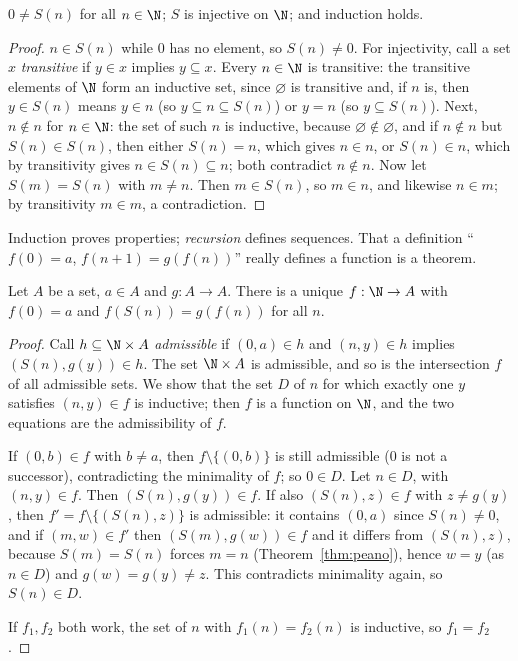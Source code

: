 \begin{theorem}\label{thm:peano}
$0\ne S(n)$ for all $n\in\N$; $S$ is injective on $\N$; and induction holds.
\end{theorem}
\begin{proof}
$n\in S(n)$ while $0$ has no element, so $S(n)\ne0$. For injectivity, call a set $x$ \emph{transitive} if $y\in x$ implies
$y\subseteq x$. Every $n\in\N$ is transitive: the transitive elements of $\N$ form an inductive set, since $\varnothing$ is transitive
and, if $n$ is, then $y\in S(n)$ means $y\in n$ (so $y\subseteq n\subseteq S(n)$) or $y=n$ (so $y\subseteq S(n)$). Next, $n\notin n$ for $n\in\N$: the
set of such $n$ is inductive, because $\varnothing\notin\varnothing$, and if $n\notin n$ but $S(n)\in S(n)$, then either $S(n)=n$, which gives $n\in n$,
or $S(n)\in n$, which by transitivity gives $n\in S(n)\subseteq n$; both contradict $n\notin n$. Now let $S(m)=S(n)$ with $m\ne n$. Then
$m\in S(n)$, so $m\in n$, and likewise $n\in m$; by transitivity $m\in m$, a contradiction.
\end{proof}

Induction proves properties; \emph{recursion} defines sequences. That a definition ``$f(0)=a$, $f(n+1)=g(f(n))$''
really defines a function is a theorem.

\begin{theorem}[recursion]\label{thm:recursion}
Let $A$ be a set, $a\in A$ and $g:A\to A$. There is a unique $f:\N\to A$ with $f(0)=a$ and $f(S(n))=g(f(n))$ for all $n$.
\end{theorem}
\begin{proof}
Call $h\subseteq\N\times A$ \emph{admissible} if $(0,a)\in h$ and $(n,y)\in h$ implies $(S(n),g(y))\in h$. The set $\N\times A$ is admissible,
and so is the intersection $f$ of all admissible sets. We show that the set $D$ of $n$ for which exactly one $y$ satisfies
$(n,y)\in f$ is inductive; then $f$ is a function on $\N$, and the two equations are the admissibility of $f$.

If $(0,b)\in f$ with $b\ne a$, then $f\setminus\{(0,b)\}$ is still admissible ($0$ is not a successor), contradicting the minimality of $f$; so $0\in D$.
Let $n\in D$, with $(n,y)\in f$. Then $(S(n),g(y))\in f$. If also $(S(n),z)\in f$ with $z\ne g(y)$, then $f'=f\setminus\{(S(n),z)\}$ is admissible: it
contains $(0,a)$ since $S(n)\ne0$, and if $(m,w)\in f'$ then $(S(m),g(w))\in f$ and it differs from $(S(n),z)$, because $S(m)=S(n)$ forces $m=n$
(Theorem~\ref{thm:peano}), hence $w=y$ (as $n\in D$) and $g(w)=g(y)\ne z$. This contradicts minimality again, so $S(n)\in D$.

If $f_1,f_2$ both work, the set of $n$ with $f_1(n)=f_2(n)$ is inductive, so $f_1=f_2$.
\end{proof}

